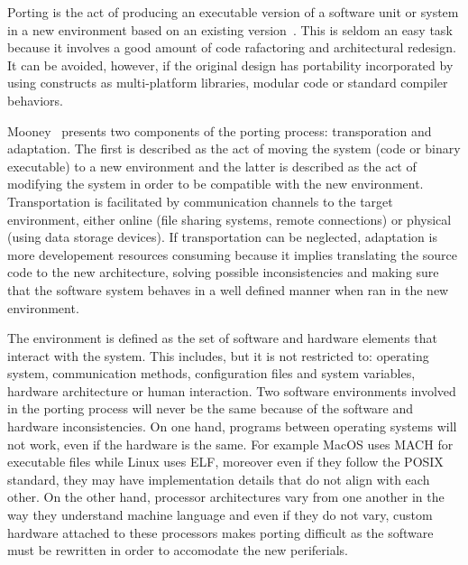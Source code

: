 \documentclass[12pt,a4paper]{report}
\begin{document}
Porting is the act of producing an executable version of a software unit or system in a new
environment based on an existing version~\cite{mooney1993issues}. This is seldom an easy task
because it involves a good amount of code rafactoring and architectural redesign. It can be
avoided, however, if the original design has portability incorporated by using constructs as
multi-platform libraries, modular code or standard compiler behaviors.

Mooney~\cite{mooney1993issues} presents two components of the porting process: transporation and
adaptation. The first is described as the act of moving the system (code or binary executable) to a
new environment and the latter is described as the act of modifying the system in order to be
compatible with the new environment. Transportation is facilitated by communication channels
to the target environment, either online (file sharing systems, remote connections) or physical
(using data storage devices). If transportation can be neglected, adaptation is more developement
resources consuming because it implies translating the source code to the new architecture, solving
possible inconsistencies and making sure that the software system behaves in a well defined manner
when ran in the new environment.

The environment is defined as the
set of software and hardware elements that interact with the system. This includes, but it is not
restricted to: operating system, communication methods, configuration files and system variables,
hardware architecture or human interaction. Two software environments involved in the porting
process will never be the same because of the software and hardware inconsistencies. On one hand,
programs between operating systems will not work, even if the hardware is the same. For example MacOS
uses MACH for executable files while Linux uses ELF, moreover even if they follow the POSIX
standard, they may have implementation details that do not align with each other. On the other
hand, processor architectures vary from one another in the way they understand machine language
and even if they do not vary, custom hardware attached to these processors makes porting difficult as
the software must be rewritten in order to accomodate the new periferials.
\end{document}

